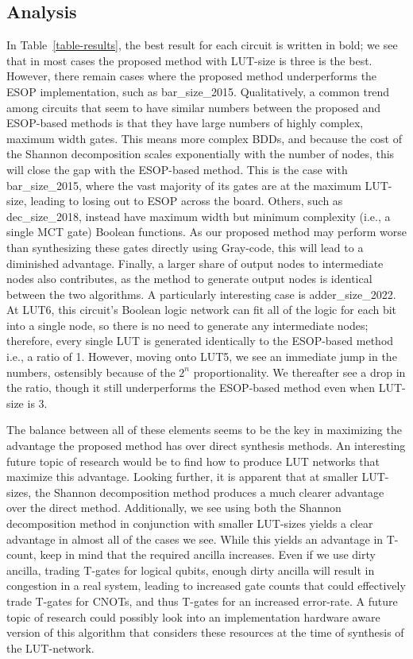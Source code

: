 \subsection{Analysis}
In Table~\ref{table-results}, the best result for each circuit is written in bold; we see that in most cases the proposed method with LUT-size is three is the best. However, there remain cases where the proposed method underperforms the ESOP implementation, such as bar\_size\_2015. 
Qualitatively, a common trend among circuits that seem to have similar 
numbers between the proposed and ESOP-based methods is that they have large
numbers of highly complex, maximum width gates. This means more
complex BDDs, and because the cost of the Shannon decomposition scales 
exponentially with the number of nodes, this will close the gap with 
the ESOP-based method. This is the case with bar\_size\_2015, where
the vast majority of its gates are at the maximum LUT-size, leading to
losing out to ESOP across the board. Others, such as dec\_size\_2018,
instead have maximum width but minimum complexity (i.e., a single MCT gate)
Boolean functions. As our proposed method may perform worse than
synthesizing these gates directly using Gray-code, this will lead to a
diminished advantage. Finally, a larger share of output nodes to 
intermediate nodes also contributes, as the method to generate output nodes is identical 
between the two algorithms. A particularly interesting case is 
adder\_size\_2022. At LUT6, this circuit's Boolean logic network can
fit all of the logic for each bit into a single node, so there is no 
need to generate any intermediate nodes; therefore, every single LUT 
is generated identically to the ESOP-based method i.e., a ratio of
1. However, moving onto LUT5, we see an immediate jump in the numbers, 
ostensibly because of the $2^n$ proportionality. We thereafter see a 
drop in the ratio, though it still underperforms the ESOP-based method
even when LUT-size is 3. 


The balance between all of these elements seems to be the key in maximizing the advantage the proposed method has over direct synthesis methods. An interesting future topic of research would be to find how
to produce LUT networks that maximize this advantage. Looking further, it is apparent that at smaller LUT-sizes, the Shannon decomposition method produces a much clearer advantage over the direct method. Additionally, we see using both the Shannon decomposition method in conjunction with smaller LUT-sizes yields a clear advantage in almost all of the cases we see. While this yields an advantage in T-count, keep in mind that the required ancilla increases. Even if we use dirty ancilla, trading T-gates for logical qubits, enough dirty ancilla will result in congestion in a real system, leading to increased gate counts that could effectively trade T-gates for CNOTs, and thus T-gates for an increased error-rate. A future topic of research could possibly look into an implementation hardware aware version of this algorithm that considers these resources at the time of synthesis of the LUT-network.





